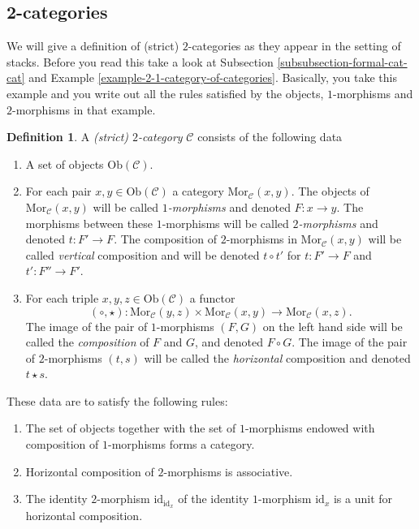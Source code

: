 \documentclass{amsart}
\theoremstyle{definition}
\newtheorem{definition}[theorem]{Definition}
\theoremstyle{remark}
\numberwithin{equation}{subsection}
\begin{document}
\subsection{2-categories}
\label{subsection-2-categories}

\noindent
We will give a definition of (strict) $2$-categories as they appear
in the setting of stacks. Before you read this take a look at
Subsection \ref{subsubsection-formal-cat-cat} and Example
\ref{example-2-1-category-of-categories}. Basically, you take this example
and you write out all the rules satisfied by the objects, $1$-morphisms
and $2$-morphisms in that example.

\begin{definition}
\label{definition-2-category}
A {\it (strict) $2$-category} $\mathcal{C}$ consists of the following data
\begin{enumerate}
\item A set of objects $\text{Ob}(\mathcal{C})$.
\item For each pair $x,y \in \text{Ob}(\mathcal{C})$
a category $\text{Mor}_\mathcal{C}(x,y)$. The objects of
$\text{Mor}_\mathcal{C}(x,y)$ will be called {\it $1$-morphisms}
and denoted $F : x \to y$. The morphisms between these $1$-morphisms
will be called {\it $2$-morphisms} and denoted $t : F' \to F$.
The composition of $2$-morphisms in $\text{Mor}_\mathcal{C}(x,y)$
will be called {\it vertical} composition and will be
denoted $t \circ t'$ for $t : F' \to F$ and $t' : F'' \to F'$.
\item For each triple $x,y,z\in \text{Ob}(\mathcal{C})$ a
functor
$$
(\circ, \star) : 
\text{Mor}_\mathcal{C}(y,z) \times \text{Mor}_\mathcal{C}(x,y) 
\longrightarrow
\text{Mor}_\mathcal{C}(x,z).
$$
The image of the pair of $1$-morphisms $(F,G)$ on the left hand side
will be called the {\it composition} of $F$ and $G$, and denoted
$F\circ G$. The image of the pair of $2$-morphisms $(t,s)$ will
be called the {\it horizontal} composition and denoted $t \star s$.
\end{enumerate}
These data are to satisfy the following rules:
\begin{enumerate}
\item The set of objects together with the set of $1$-morphisms endowed
with composition of $1$-morphisms forms a category.
\item Horizontal composition of $2$-morphisms is associative.
\item The identity $2$-morphism $\text{id}_{\text{id}_x}$
of the identity $1$-morphism $\text{id}_x$ is a unit for
horizontal composition.
\end{enumerate}
\end{definition}
\end{document}
